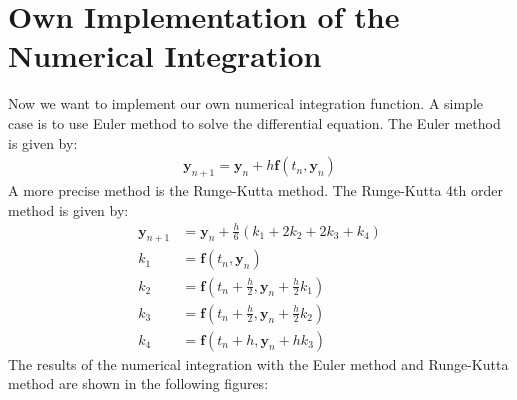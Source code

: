 \documentclass[12pt
,headinclude
,headsepline
,bibtotocnumbered
]{scrartcl}
\begin{document}
\section*{Own Implementation of the Numerical Integration}
Now we want to implement our own numerical integration function. A simple case is to use Euler method to solve the differential equation. The Euler method is given by:
\begin{align*}
    \textbf{y}_{n+1}=\textbf{y}_n+h\textbf{f}(t_n,\textbf{y}_n)
\end{align*}
A more precise method is the Runge-Kutta method. The Runge-Kutta 4th order method is given by:
\begin{align*}
    \textbf{y}_{n+1}&=\textbf{y}_n+\frac{h}{6}(k_1+2k_2+2k_3+k_4)\\
    k_1&=\textbf{f}(t_n,\textbf{y}_n)\\
    k_2&=\textbf{f}(t_n+\frac{h}{2},\textbf{y}_n+\frac{h}{2}k_1)\\
    k_3&=\textbf{f}(t_n+\frac{h}{2},\textbf{y}_n+\frac{h}{2}k_2)\\
    k_4&=\textbf{f}(t_n+h,\textbf{y}_n+hk_3)
\end{align*}
The results of the numerical integration with the Euler method and Runge-Kutta method are shown in the following figures:
\end{document}
